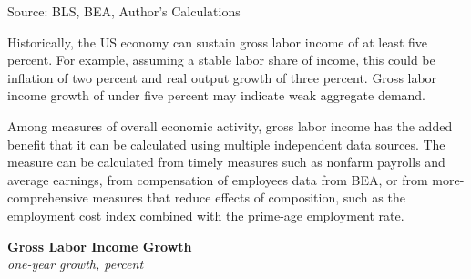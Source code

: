 \documentclass{report}
\makeatletter
\newcommand{\tbllink}[1]{\href{https://raw.githubusercontent.com/bdecon/US-chartbook/master/chartbook/data/#1}{\faTable}}
\newcommand*\short[1]{\expandafter\@gobbletwo\number\numexpr#1\relax}
\newcommand{\sbar}[4]{
		\addplot[ybar stacked, bar width=2.3pt, draw opacity=0, fill=#1] 
			table [x=#2, y=#3, col sep=comma]{#4};}
\newcommand{\dateaxisticks}{
		date coordinates in=x, axis line style={draw=none},
		xmax={2024-01-31},
		max space between ticks=40,	    
		xtick={{1990-01-01}, {1992-01-01}, {1994-01-01}, 
			{1996-01-01}, {1998-01-01}, {2000-01-01}, 
			{2002-01-01}, {2004-01-01}, {2006-01-01},
			{2008-01-01}, {2010-01-01}, {2012-01-01}, {2014-01-01},
		    {2016-01-01}, {2018-01-01}, {2020-01-01}, {2022-01-01}, 
		    {2024-01-01}, {2026-01-01}},
		minor xtick={{1989-01-01}, {1991-01-01}, {1993-01-01},
			{1995-01-01}, {1997-01-01}, {1999-01-01}, 
			{2001-01-01}, {2003-01-01}, {2005-01-01}, {2007-01-01},
		    {2009-01-01}, {2011-01-01}, {2013-01-01}, {2015-01-01},
		    {2017-01-01}, {2019-01-01}, {2021-01-01}, {2023-01-01}, 
		    {2025-01-01}, {2027-01-01}},
		enlarge y limits={0.06}, enlarge x limits={0.01},
		xticklabel style={align=center, yshift=-2pt}, tick label style={inner sep=0pt},
		}
\newcommand{\ltdateaxisticks}{
		date coordinates in=x, axis line style={draw=none},
		xmax={2024-01-31},
		max space between ticks=40,	    
		xtick={{2013-01-01}, {2014-01-01}, {2015-01-01}, {2016-01-01}, 
			{2017-01-01}, {2018-01-01}, {2019-01-01}, {2020-01-01}, {2021-01-01},
			{2022-01-01}, {2023-01-01}, {2024-01-01}},
		enlarge y limits={0.06}, enlarge x limits={0.01},
		xticklabel style={align=center, yshift=-2pt}, tick label style={inner sep=0pt},
		}
\newcommand{\bbar}[2]{extra #1 ticks = {{#2}}, extra #1 tick labels = ,
		extra #1 tick style = {grid=major, grid style={thick, black!25}},}
\newcommand{\stdline}[4]{\addplot[very thick, no markers, color=#1] 
		table [x=#2, y=#3, col sep=comma] {#4};	}
\newcommand{\rbars}{
		\fill[color=black!10] (axis cs:{1990-07-01},\pgfkeysvalueof{/pgfplots/ymin})
			rectangle (axis cs:{1991-03-01}, \pgfkeysvalueof{/pgfplots/ymax});
		\fill[color=black!10] (axis cs:{2007-12-01},\pgfkeysvalueof{/pgfplots/ymin})
			rectangle (axis cs:{2009-07-01}, \pgfkeysvalueof{/pgfplots/ymax});
		\fill[color=black!10] (axis cs:{2001-03-01},\pgfkeysvalueof{/pgfplots/ymin})
			rectangle (axis cs:{2001-11-01}, \pgfkeysvalueof{/pgfplots/ymax});
		\fill[color=black!10] (axis cs:{2020-02-01},\pgfkeysvalueof{/pgfplots/ymin})
			rectangle (axis cs:{2020-05-01}, \pgfkeysvalueof{/pgfplots/ymax});}
\newcommand{\rbar}{
		\fill[color=black!10] (axis cs:{2020-02-01},\pgfkeysvalueof{/pgfplots/ymin}) 
			rectangle (axis cs:{2020-05-01}, \pgfkeysvalueof{/pgfplots/ymax});}
\makeatother
\begin{document}
{\begin{minipage}{1.0\textwidth}
\hspace{3mm} 

\footnotesize{Source: BLS, BEA, Author's Calculations} \hfill \tbllink{gli.csv}
\vspace{2mm}

\small Historically, the US economy can sustain gross labor income of at least five percent. For example, assuming a stable labor share of income, this could be inflation of two percent and real output growth of three percent. Gross labor income growth of under five percent may indicate weak aggregate demand. 

Among measures of overall economic activity, gross labor income has the added benefit that it can be calculated using multiple independent data sources. The measure can be calculated from timely measures such as nonfarm payrolls and average earnings, from compensation of employees data from BEA, or from more-comprehensive measures that reduce effects of composition, such as the employment cost index combined with the prime-age employment rate. 


\end{minipage}
\vspace*{-1mm}

\begin{minipage}{0.46\textwidth}
\normalsize \textbf{Gross Labor Income Growth}\\
\footnotesize{\textit{one-year growth, percent}}
\vspace{4.0cm}

\hspace{2mm} 


\end{minipage}}
\end{document}
